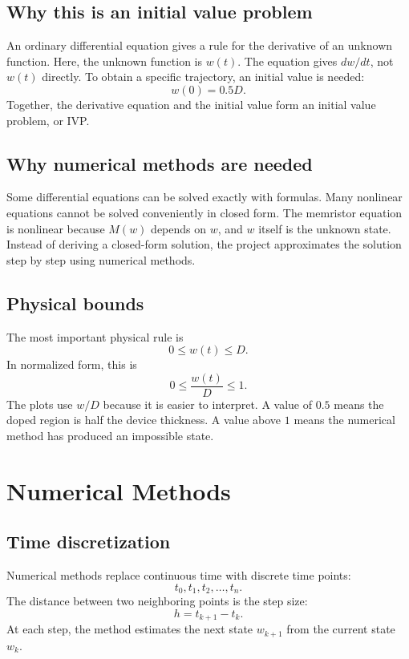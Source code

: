 \documentclass[11pt]{article}
\begin{document}
\subsection{Why this is an initial value problem}

An ordinary differential equation gives a rule for the derivative of an unknown function. Here, the unknown function is \(w(t)\). The equation gives \(dw/dt\), not \(w(t)\) directly. To obtain a specific trajectory, an initial value is needed:
\[
w(0) = 0.5D.
\]
Together, the derivative equation and the initial value form an initial value problem, or IVP.

\subsection{Why numerical methods are needed}

Some differential equations can be solved exactly with formulas. Many nonlinear equations cannot be solved conveniently in closed form. The memristor equation is nonlinear because \(M(w)\) depends on \(w\), and \(w\) itself is the unknown state. Instead of deriving a closed-form solution, the project approximates the solution step by step using numerical methods.

\subsection{Physical bounds}

The most important physical rule is
\[
0 \leq w(t) \leq D.
\]
In normalized form, this is
\[
0 \leq \frac{w(t)}{D} \leq 1.
\]
The plots use \(w/D\) because it is easier to interpret. A value of \(0.5\) means the doped region is half the device thickness. A value above \(1\) means the numerical method has produced an impossible state.

\section{Numerical Methods}

\subsection{Time discretization}

Numerical methods replace continuous time with discrete time points:
\[
t_0, t_1, t_2, \ldots, t_n.
\]
The distance between two neighboring points is the step size:
\[
h = t_{k+1} - t_k.
\]
At each step, the method estimates the next state \(w_{k+1}\) from the current state \(w_k\).
\end{document}

